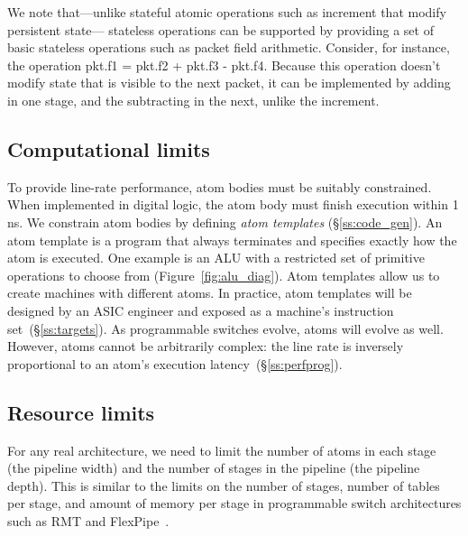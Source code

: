 We note that---unlike stateful atomic operations such as increment
that modify persistent state--- stateless operations can be supported
by providing a set of basic stateless operations such as packet field
arithmetic. Consider, for instance, the operation pkt.f1 = pkt.f2 +
pkt.f3 - pkt.f4. Because this operation doesn't modify state that is
visible to the next packet, it can be implemented by adding in one
stage, and the subtracting in the next, unlike the increment.

\subsection{Computational limits}
\label{s:atomConstraints}


To provide line-rate performance, atom bodies must be suitably constrained.
When implemented in digital logic, the atom body must finish execution within 1
ns. We constrain atom bodies by defining {\it atom templates}
(\S\ref{ss:code_gen}).  An atom template is a program that always terminates
and specifies exactly how the atom is executed. One example is an ALU with a
restricted set of primitive operations to choose from
(Figure~\ref{fig:alu_diag}). Atom templates allow us to create \absmachine
machines with different atoms.  In practice, atom templates will be designed by
an ASIC engineer and exposed as a machine's instruction
set~(\S\ref{ss:targets}).  As programmable switches evolve, atoms will evolve
as well.  However, atoms cannot be arbitrarily complex: the line rate is
inversely proportional to an atom's execution latency~(\S\ref{ss:perfprog}).

\subsection{Resource limits}
\label{s:resource}

For any real architecture, we need to limit the number of atoms in each stage
(the pipeline width) and the number of stages in the pipeline (the pipeline
depth). This is similar to the limits on the number of stages, number of tables
per stage, and amount of memory per stage in programmable switch architectures
such as RMT and FlexPipe~\cite{lavanya_compiler}.
